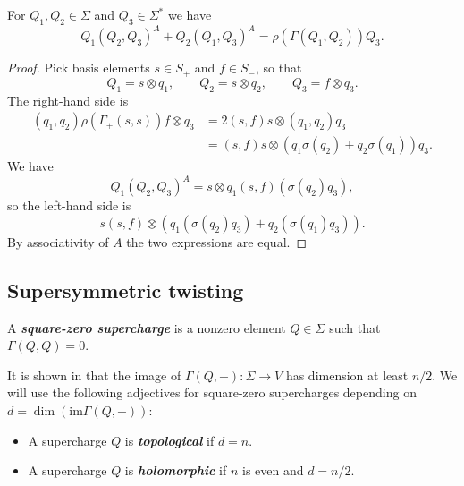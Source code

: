 \documentclass[10pt, oneside]{article}
\newcommand{\defterm}[1]{\textbf{\emph{#1}}}
\begin{document}
\begin{thm}
For $Q_1, Q_2\in\Sigma$ and $Q_3\in\Sigma^*$ we have
\[Q_1(Q_2, Q_3)^A + Q_2(Q_1, Q_3)^A = \rho(\Gamma(Q_1, Q_2))Q_3.\]
\label{thm:2dmatter3psi}
\end{thm}
\begin{proof}
Pick basis elements $s\in S_+$ and $f\in S_-$, so that
\[Q_1 = s\otimes q_1,\qquad Q_2 = s\otimes q_2,\qquad Q_3 = f\otimes q_3.\]
The right-hand side is
\begin{align*}
(q_1, q_2) \rho(\Gamma_+(s, s)) f\otimes q_3 &= 2(s, f) s\otimes (q_1, q_2) q_3 \\
&= (s, f) s\otimes (q_1\sigma(q_2) + q_2\sigma(q_1)) q_3.
\end{align*}
We have
\[Q_1(Q_2, Q_3)^A = s\otimes q_1 (s, f) (\sigma(q_2)q_3),\]
so the left-hand side is
\[s(s, f)\otimes (q_1(\sigma(q_2) q_3) + q_2(\sigma(q_1)q_3)).\]
By associativity of $A$ the two expressions are equal.
\end{proof}

\subsection{Supersymmetric twisting}


\begin{definition}
A \defterm{square-zero supercharge} is a nonzero element $Q\in\Sigma$ such that $\Gamma(Q, Q)=0$.
\end{definition}

It is shown in \cite[Proposition 3.25]{ElliottSafronov} that the image of $\Gamma(Q, -)\colon \Sigma\rightarrow V$ has dimension at least $n/2$. We will use the following adjectives for square-zero supercharges depending on $d=\dim(\mathrm{im}\Gamma(Q, -))$:
\begin{itemize}
\item A supercharge $Q$ is \defterm{topological} if $d = n$.

\item A supercharge $Q$ is \defterm{holomorphic} if $n$ is even and $d=n/2$.
\end{itemize}
\end{document}

